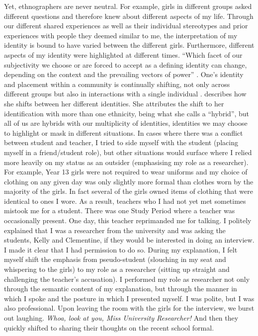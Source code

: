 
Yet, ethnographers are never neutral.  For example, girls in different groups asked different questions and therefore knew about different aspects of my life.  Through our different shared experiences as well as their individual stereotypes and prior experiences with people they deemed similar to me, the interpretation of my identity is bound to have varied between the different girls.  Furthermore, different aspects of my identity were highlighted at different times.  ``Which facet of our subjectivity we choose or are forced to accept as a defining identity can change, depending on the context and the prevailing vectors of power'' \cite[676]{narayan1993}.  One's identity and placement within a community is continually shifting, not only across different groups but also in interactions with a single individual \cite[680]{narayan1993}.   describes how she shifts between her different identities.  She attributes the shift to her identification with more than one ethnicity, being what she calls a ``hybrid'', but all of us are hybrids with our multiplicity of identities, identities we may choose to highlight or mask in different situations.  In cases where there was a conflict between student and teacher, I tried to side myself with the student (placing myself in a friend/student role), but other situations would surface where I relied more heavily on my status as an outsider (emphasising my role as a researcher).  For example, Year 13 girls were not required to wear uniforms and my choice of clothing on any given day was only slightly more formal than clothes worn by the majority of the girls.  In fact several of the girls owned items of clothing that were identical to ones I wore.  As a result, teachers who I had not yet met sometimes mistook me for a student.  There was one Study Period where a teacher was occasionally present.  One day, this teacher reprimanded me for talking.  I politely explained that I was a researcher from the university and was asking the students, Kelly and Clementine, if they would be interested in doing an interview. I made it clear that I had permission to do so.  During my explanation, I felt myself shift the emphasis from pseudo-student (slouching in my seat and whispering to the girls) to my role as a researcher (sitting up straight and challenging the teacher's accusation).  I performed my role as researcher not only through the semantic content of my explanation, but through the manner in which I spoke and the posture in which I presented myself.  I was polite, but I was also professional.  Upon leaving the room with the girls for the interview, we burst out laughing.  \textit{Whoa, look at you, Miss University Researcher!} And then they quickly shifted to sharing their thoughts on the recent school formal.


